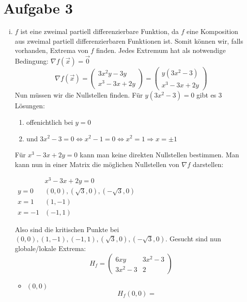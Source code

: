 \documentclass[10pt,a4paper,parskip=half]{scrartcl}
\begin{document}
\section*{Aufgabe 3}
\begin{enumerate}[(i)]
	\item 	\(f\) ist eine zweimal partiell differenzierbare Funktion, da \(f\) eine Komposition aus zweimal partiell differenzierbaren Funktionen ist. Somit können wir, falls vorhanden, Extrema von $f$ finden. Jedes Extremum hat als notwendige Bedingung: $\nabla f(\vec x) = \vec 0$
	\[ \nabla f (\vec x) = 
	\begin{pmatrix}
		3x^2y - 3y \\
		x^3 - 3x + 2y 
	\end{pmatrix} =  
	\begin{pmatrix}
		y(3x^2 - 3) \\
		x^3 - 3x + 2y 
	\end{pmatrix}  \]
Nun müssen wir die Nullstellen finden.
Für \( y(3x^2 -3) = 0 \) gibt es 3 Lösungen:
\begin{enumerate}
	\item offenichtlich bei $y = 0$
	\item  und \(3x^2 - 3 = 0 \Leftrightarrow x^2 - 1 = 0 \Leftrightarrow x^2 = 1 \Rightarrow x = \pm 1\)
\end{enumerate}
Für \( x^3 - 3x + 2y  = 0 \) kann man keine direkten Nullstellen bestimmen.
Man kann nun in einer Matrix die möglichen Nullstellen von $\nabla f$ darstellen: \\
\begin{center}
\begin{math}
	\begin{array}{c|cc}
	 & x^3 - 3x + 2y  = 0  \\
	 \hline
	 y = 0 & (0,0),(\sqrt{3},0),(-\sqrt{3},0)\\
	 x = 1 & (1,-1)\\
	 x = -1 & (-1,1)
	\end{array}
\end{math}
\end{center}
Also sind die kritischen Punkte bei $(0,0), (1,-1),(-1,1),(\sqrt{3},0),(-\sqrt{3},0)$. Gesucht sind nun globale/lokale Extrema:
	\[H_f = 
	\begin{pmatrix}
		6xy & 3x^2 - 3 \\
		3x^2 - 3 & 2	
	\end{pmatrix} \]
	\begin{itemize}
		\item 	$(0,0)$
			\[H_f(0,0) = 
\]
\end{itemize}
\end{enumerate}
\end{document}
